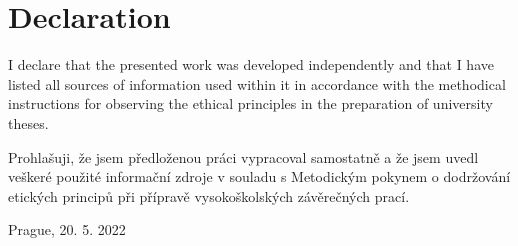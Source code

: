 \chapter*{Declaration}

I declare that the presented work was developed independently and that I have
listed all sources of information used within it in accordance with the
methodical instructions for observing the ethical principles in the preparation
of university theses.

\vspace{0.5cm}
\noindent
Prohlašuji, že jsem předloženou práci vypracoval samostatně a že jsem uvedl
veškeré použité informační zdroje v souladu s Metodickým pokynem o
dodržování etických principů při přípravě vysokoškolských závěrečných prací.

\vspace{0.5cm}
Prague, 20. 5. 2022 \hfill \underline{\hspace{5cm}}
